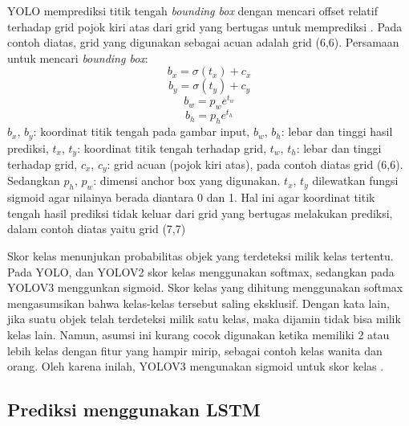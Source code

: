 \documentclass[conference]{IEEEtran}
\begin{document}
YOLO memprediksi titik tengah \textit{bounding box} dengan mencari offset relatif terhadap grid pojok kiri atas dari grid yang bertugas untuk memprediksi \cite{YoloV2}. Pada contoh diatas, grid yang digunakan sebagai acuan adalah grid (6,6).
Persamaan untuk mencari \textit{bounding box}:
\begin{equation} \label{bx_bb}
	b_{x} = \sigma(t_{x}) + c_x
   \end{equation}
\begin{equation} \label{by_bb}
	b_{y} = \sigma(t_{y}) + c_y
\end{equation}
\begin{equation} \label{bw_bb}
	b_{w} = p_{w}e^{t_w}
\end{equation}
\begin{equation} \label{bh_bb}
	b_{h} = p_{h}e^{t_h}
\end{equation}
$b_x$, $b_y$: koordinat titik tengah pada gambar input, $b_w$, $b_h$: lebar dan tinggi hasil prediksi, $t_x$, $t_y$: koordinat titik tengah terhadap grid, $t_w$, $t_h$: lebar dan tinggi terhadap grid, $c_x$, $c_y$: grid acuan (pojok kiri atas), pada contoh diatas grid (6,6). Sedangkan $p_h$, $p_w$: dimensi anchor box yang digunakan. 
$t_x$, $t_y$ dilewatkan fungsi sigmoid agar nilainya berada diantara 0 dan 1. Hal ini agar koordinat titik tengah hasil prediksi tidak keluar dari grid yang bertugas melakukan prediksi, dalam contoh diatas yaitu grid (7,7)

Skor kelas menunjukan probabilitas objek yang terdeteksi milik kelas tertentu. Pada YOLO, dan YOLOV2 skor kelas menggunakan softmax, sedangkan pada YOLOV3 menggunkan sigmoid.
Skor kelas yang dihitung menggunakan softmax mengasumsikan bahwa kelas-kelas tersebut saling eksklusif. Dengan kata lain, jika suatu objek telah terdeteksi milik satu kelas, maka dijamin tidak bisa milik kelas lain. 
Namun, asumsi ini kurang cocok digunakan ketika memiliki 2 atau lebih kelas dengan fitur yang hampir mirip, sebagai contoh kelas wanita dan orang. Oleh karena inilah, YOLOV3 mengunakan sigmoid untuk skor kelas \cite{YoloV3}.

\subsection{Prediksi menggunakan LSTM}
\end{document}
